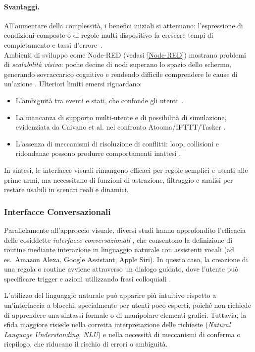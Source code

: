 \paragraph{Svantaggi.}
All’aumentare della complessità, i benefici iniziali si attenuano: l’espressione di condizioni composte o di regole multi‑dispositivo fa crescere tempi di completamento e tassi d’errore~\cite{Coutaz2016}. \\
Ambienti di sviluppo come Node‑RED (vedasi \ref{Node-RED})  mostrano problemi di \emph{scalabilità visiva}: poche decine di nodi superano lo spazio dello schermo, generando sovraccarico cognitivo e rendendo difficile comprendere le cause di un’azione \cite{Lago2021}.
Ulteriori limiti emersi riguardano:
\begin{itemize}
    \item L’ambiguità tra eventi e stati, che confonde gli utenti~\cite{Lago2021}.
    \item La mancanza di supporto multi‑utente e di possibilità di simulazione, evidenziata da Caivano et al. nel confronto Atooma/IFTTT/Tasker \cite{Caivano2018}.
    \item L’assenza di meccanismi di risoluzione di conflitti: loop, collisioni e ridondanze possono produrre comportamenti inattesi \cite{Corno2020,Chen2021}.
\end{itemize}
In sintesi, le interfacce visuali rimangono efficaci per regole semplici e utenti alle prime armi, ma necessitano di funzioni di astrazione, filtraggio e analisi per restare usabili in scenari reali e dinamici.




\subsubsection{Interfacce Conversazionali}
Parallelamente all’approccio visuale, diversi studi hanno approfondito l’efficacia delle cosiddette \emph{interfacce conversazionali} \cite{Barricelli2024}, che consentono la definizione di routine mediante interazione in linguaggio naturale con assistenti vocali (ad es.\ Amazon Alexa, Google Assistant, Apple Siri). 
In questo caso, la creazione di una regola o routine avviene attraverso un dialogo guidato, dove l’utente può specificare trigger e azioni utilizzando frasi colloquiali \cite{Barricelli2024, Gallo2024Conversational}.

L’utilizzo del linguaggio naturale può apparire più intuitivo rispetto a un’interfaccia a blocchi, specialmente per utenti poco esperti, poiché non richiede di apprendere una sintassi formale o di manipolare elementi grafici. Tuttavia, la sfida maggiore risiede nella corretta interpretazione delle richieste (\emph{Natural Language Understanding, NLU}) e nella necessità di meccanismi di conferma o riepilogo, che riducano il rischio di errori o ambiguità.

